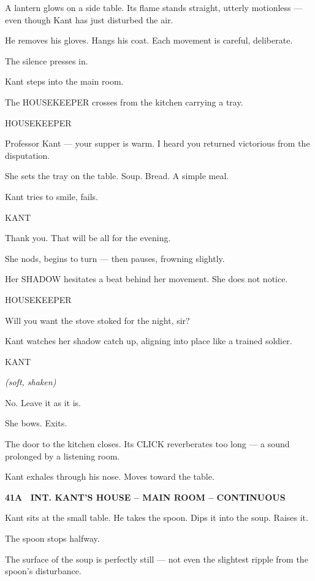 \documentclass[12pt]{article}
\newcommand{\scene}[2]{%
  \vspace{1.8\baselineskip}%
  \noindent\textbf{#1 \ #2}\par\vspace{0.4\baselineskip}%
}
\newenvironment{dialogue}[1]{%
  \vspace{0.8\baselineskip}%
  \noindent\hspace*{2.3in}\textsc{#1}\par%
  \noindent\hspace*{1.5in}\begin{minipage}[t]{4.5in}%
}{%
  \end{minipage}\par%
}
\newcommand{\paren}[1]{%
  \noindent\hspace*{1.8in}\textit{(#1)}\par%
}
\begin{document}
A lantern glows on a side table. Its flame stands straight, utterly
motionless — even though Kant has just disturbed the air.

He removes his gloves. Hangs his coat.
Each movement is careful, deliberate.

The silence presses in.

Kant steps into the main room.

The HOUSEKEEPER crosses from the kitchen carrying a tray.

\begin{dialogue}{HOUSEKEEPER}
Professor Kant — your supper is warm.
I heard you returned victorious from the disputation.
\end{dialogue}

She sets the tray on the table.
Soup. Bread. A simple meal.

Kant tries to smile, fails.

\begin{dialogue}{KANT}
Thank you. That will be all for the evening.
\end{dialogue}

She nods, begins to turn — then pauses, frowning slightly.

Her SHADOW hesitates a beat behind her movement.
She does not notice.

\begin{dialogue}{HOUSEKEEPER}
Will you want the stove stoked for the night, sir?
\end{dialogue}

Kant watches her shadow catch up, aligning into place like a trained soldier.

\begin{dialogue}{KANT}
\paren{soft, shaken}
No. Leave it as it is.
\end{dialogue}

She bows. Exits.

The door to the kitchen closes.
Its CLICK reverberates too long —
a sound prolonged by a listening room.

Kant exhales through his nose. Moves toward the table.


\scene{41A}{INT. KANT'S HOUSE -- MAIN ROOM -- CONTINUOUS}

Kant sits at the small table.
He takes the spoon. Dips it into the soup.
Raises it.

The spoon stops halfway.

The surface of the soup is perfectly still —
not even the slightest ripple from the spoon’s disturbance.
\end{document}
